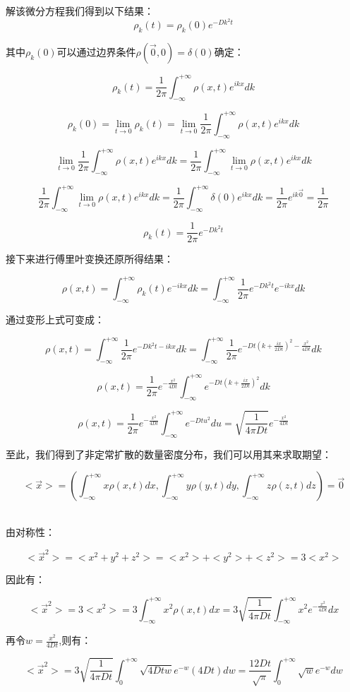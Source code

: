 解该微分方程我们得到以下结果：
\[\rho_k(t)=\rho_k(0)e^{-Dk^2t}\]

其中$\rho_k(0)$可以通过边界条件$\rho(\vec{0},0)=\delta(0)$确定：

\[\rho_k(t)=\frac{1}{2\pi}\int_{-\infty}^{+\infty}\rho(x,t)e^{ikx}dk\]

\[\rho_k(0)=\lim_{t \rightarrow 0}\rho_k(t)=\lim_{t \rightarrow 0}\frac{1}{2\pi}\int_{-\infty}^{+\infty}\rho(x,t)e^{ikx}dk\]

\[\lim_{t \rightarrow 0}\frac{1}{2\pi}\int_{-\infty}^{+\infty}\rho(x,t)e^{ikx}dk=\frac{1}{2\pi}\int_{-\infty}^{+\infty}\lim_{t \rightarrow 0}\rho(x,t)e^{ikx}dk\]

\[\frac{1}{2\pi}\int_{-\infty}^{+\infty}\lim_{t \rightarrow 0}\rho(x,t)e^{ikx}dk=\frac{1}{2\pi}\int_{-\infty}^{+\infty}\delta(0)e^{ikx}dk=\frac{1}{2\pi}e^{ik\vec{0}}=\frac{1}{2\pi}\]

\[\rho_k(t)=\frac{1}{2\pi}e^{-Dk^2t} \tag{e}\]

接下来进行傅里叶变换还原所得结果：

\[\rho(x,t)=\int_{-\infty}^{+\infty}\rho_k(t)e^{-ikx}dk=\int_{-\infty}^{+\infty}\frac{1}{2\pi}e^{-Dk^2t} e^{-ikx}dk\]

通过变形上式可变成：

\[\rho(x,t)=\int_{-\infty}^{+\infty}\frac{1}{2\pi}e^{-Dk^2t-ikx}dk=\int_{-\infty}^{+\infty}\frac{1}{2\pi}e^{-Dt(k+\frac{ix}{2Dt})^2-\frac{x^2}{4Dt}}dk\]

\[\rho(x,t)=\frac{1}{2\pi}e^{-\frac{x^2}{4Dt}}\int_{-\infty}^{+\infty}e^{-Dt(k+\frac{ix}{2Dt})^2}dk\]

\[\rho(x,t)=\frac{1}{2\pi}e^{-\frac{x^2}{4Dt}}\int_{-\infty}^{+\infty}e^{-Dtu^2}du=\sqrt{\frac{1}{4\pi Dt}}e^{-\frac{x^2}{4Dt}} \tag{f}\]

至此，我们得到了非定常扩散的数量密度分布，我们可以用其来求取期望：

\[<\vec{x}>=\left (\int_{-\infty}^{+\infty}x\rho(x,t)dx,\int_{-\infty}^{+\infty}y\rho(y,t)dy ,\int_{-\infty}^{+\infty}z\rho(z,t)dz \right )=\vec{0}\]\

由对称性：

\[<\vec{x}^2>=<x^2+y^2+z^2>=<x^2>+<y^2>+<z^2>=3<x^2>\]

因此有：

\[<\vec{x}^2>=3<x^2>=3\int_{-\infty}^{+\infty}x^2\rho(x,t)dx=3 \sqrt{\frac{1}{4\pi Dt}}\int_{-\infty}^{+\infty}x^2e^{-\frac{x^2}{4Dt}}dx\]

再令$w=\frac{x^2}{4Dt}$,则有：

\[<\vec{x}^2>=3\sqrt{\frac{1}{4\pi Dt}}\int_{0}^{+\infty}\sqrt{4Dtw}e^{-w}(4Dt)dw=\frac{12Dt}{\sqrt{\pi}}\int_{0}^{+\infty}\sqrt{w}e^{-w}dw\]

